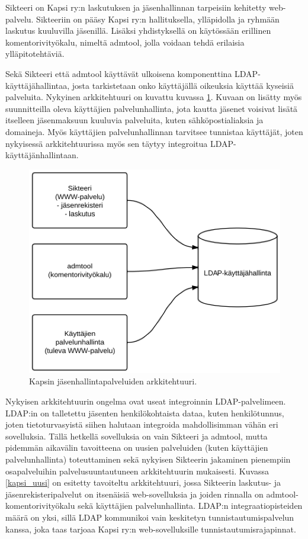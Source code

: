 Sikteeri on Kapsi ry:n laskutuksen ja jäsenhallinnan tarpeisiin kehitetty web-palvelu. Sikteeriin on pääsy Kapsi ry:n hallituksella, ylläpidolla ja ryhmään laskutus kuuluvilla jäsenillä. Lisäksi yhdistyksellä on käytössään erillinen komentorivityökalu, nimeltä admtool, jolla voidaan tehdä erilaisia ylläpitotehtäviä.

Sekä Sikteeri että admtool käyttävät ulkoisena komponenttina LDAP-käyt\-tä\-jä\-hal\-lin\-taa, josta tarkistetaan onko käyttäjällä oikeuksia käyttää kyseisiä palveluita. Nykyinen arkkitehtuuri on kuvattu kuvassa \ref{kapsi_nykyinen}. Kuvaan on lisätty myös suunnitteilla oleva käyttäjien palvelunhallinta, jota kautta jäsenet voisivat lisätä itselleen jäsenmaksuun kuuluvia palveluita, kuten sähköpostialiaksia ja domaineja. Myös käyttäjien palvelunhallinnan tarvitsee tunnistaa käyttäjät, joten nykyisessä arkkitehtuurissa myös sen täytyy integroitua LDAP-käyttäjänhallintaan.

\begin{figure}[h]
\centering
\includegraphics[width=.7\textwidth]{toteutus/kapsi_nykyinen.eps}
\caption{Kapsin jäsenhallintapalveluiden arkkitehtuuri.}%
\label{kapsi_nykyinen}
\end{figure}

Nykyisen arkkitehtuurin ongelma ovat useat integroinnin LDAP-palvelimeen. LDAP:in on talletettu jäsenten henkilökohtaista dataa, kuten henkilötunnus, joten tietoturvasyistä siihen halutaan integroida mahdollisimman vähän eri sovelluksia. Tällä hetkellä sovelluksia on vain Sikteeri ja admtool, mutta pidemmän aikavälin tavoitteena on uusien palveluiden (kuten käyttäjien palvelunhallinta) toteuttaminen sekä nykyisen Sikteerin jakaminen pienempiin osapalveluihin palvelusuuntautuneen arkkitehtuurin mukaisesti. Kuvassa \ref{kapsi_uusi} on esitetty tavoiteltu arkkitehtuuri, jossa Sikteerin laskutus- ja jäsenrekisteripalvelut on itsenäisiä web-sovelluksia ja joiden rinnalla on admtool-komentorivityökalu sekä käyttäjien palvelunhallinta. LDAP:n integraatiopisteiden määrä on yksi, sillä LDAP kommunikoi vain keskitetyn tunnistautumispalvelun kanssa, joka taas tarjoaa Kapsi ry:n web-sovelluksille tunnistautumisrajapinnat.

